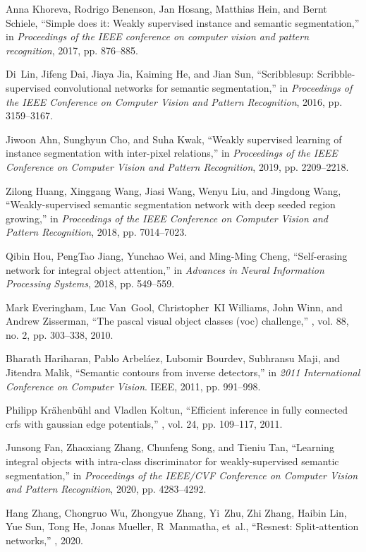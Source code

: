 \documentclass{article}
\begin{document}
\begin{thebibliography}{10}
Anna Khoreva, Rodrigo Benenson, Jan Hosang, Matthias Hein, and Bernt Schiele,
\newblock ``Simple does it: Weakly supervised instance and semantic
  segmentation,''
\newblock in {\em Proceedings of the IEEE conference on computer vision and
  pattern recognition}, 2017, pp. 876--885.

Di~Lin, Jifeng Dai, Jiaya Jia, Kaiming He, and Jian Sun,
\newblock ``Scribblesup: Scribble-supervised convolutional networks for
  semantic segmentation,''
\newblock in {\em Proceedings of the IEEE Conference on Computer Vision and
  Pattern Recognition}, 2016, pp. 3159--3167.

Jiwoon Ahn, Sunghyun Cho, and Suha Kwak,
\newblock ``Weakly supervised learning of instance segmentation with
  inter-pixel relations,''
\newblock in {\em Proceedings of the IEEE Conference on Computer Vision and
  Pattern Recognition}, 2019, pp. 2209--2218.

Zilong Huang, Xinggang Wang, Jiasi Wang, Wenyu Liu, and Jingdong Wang,
\newblock ``Weakly-supervised semantic segmentation network with deep seeded
  region growing,''
\newblock in {\em Proceedings of the IEEE Conference on Computer Vision and
  Pattern Recognition}, 2018, pp. 7014--7023.

Qibin Hou, PengTao Jiang, Yunchao Wei, and Ming-Ming Cheng,
\newblock ``Self-erasing network for integral object attention,''
\newblock in {\em Advances in Neural Information Processing Systems}, 2018, pp.
  549--559.

Mark Everingham, Luc Van~Gool, Christopher~KI Williams, John Winn, and Andrew
  Zisserman,
\newblock ``The pascal visual object classes (voc) challenge,''
, vol. 88, no. 2, pp.
  303--338, 2010.

Bharath Hariharan, Pablo Arbel{\'a}ez, Lubomir Bourdev, Subhransu Maji, and
  Jitendra Malik,
\newblock ``Semantic contours from inverse detectors,''
\newblock in {\em 2011 International Conference on Computer Vision}. IEEE,
  2011, pp. 991--998.

Philipp Kr{\"a}henb{\"u}hl and Vladlen Koltun,
\newblock ``Efficient inference in fully connected crfs with gaussian edge
  potentials,''
, vol. 24, pp.
  109--117, 2011.

Junsong Fan, Zhaoxiang Zhang, Chunfeng Song, and Tieniu Tan,
\newblock ``Learning integral objects with intra-class discriminator for
  weakly-supervised semantic segmentation,''
\newblock in {\em Proceedings of the IEEE/CVF Conference on Computer Vision and
  Pattern Recognition}, 2020, pp. 4283--4292.

Hang Zhang, Chongruo Wu, Zhongyue Zhang, Yi~Zhu, Zhi Zhang, Haibin Lin, Yue
  Sun, Tong He, Jonas Mueller, R~Manmatha, et~al.,
\newblock ``Resnest: Split-attention networks,''
, 2020.

\end{thebibliography}
\end{document}
